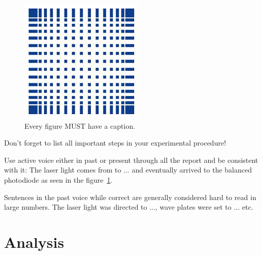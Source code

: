 \documentclass[letterpaper,12pt]{article}
\begin{document}
	\begin{figure}[ht] 
		\centering \includegraphics[width=0.8\columnwidth]{Images/hsMannheim.jpg}
		\caption{
			\label{fig:samplesetup} %
			Every figure MUST have a caption.
		}
	\end{figure}
	
	Don't forget to list all important steps in your experimental procedure!
	
	Use active voice either in past or present through all the report and be
	consistent with it:
	The laser light comes  from to ... and eventually arrived to the
	balanced photodiode as seen in the figure~\ref{fig:samplesetup}.
	
	Sentences in the past voice while correct are generally considered hard to read
	in large numbers. The laser light was directed to ..., wave plates were set
	to ... etc.
	
	
	\section{Analysis}
	
\end{document}
